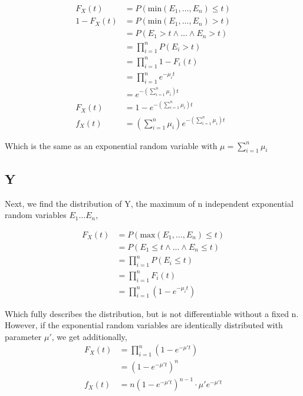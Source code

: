\documentclass{article}
\begin{document}
    \begin{align*}
            F_X(t) &= P(\text{min}(E_1, \dots, E_n) \le t) \\
        1 - F_X(t) &= P(\text{min}(E_1, \dots, E_n) > t) \\
                   &= P(E_1 > t \land \dots \land E_n > t) \\
                   &= \prod_{i=1}^n P(E_i > t) \\
                   &= \prod_{i=1}^n 1 - F_i(t) \\
                   &= \prod_{i=1}^n e^{-\mu_i t} \\
                   &= e^{-(\sum_{i=1}^n\mu_i) t} \\
            F_X(t) &= 1 - e^{-(\sum_{i=1}^n\mu_i) t} \\
            f_X(t) &= (\sum_{i=1}^n\mu_i) e^{-(\sum_{i=1}^n\mu_i) t}
    \end{align*}

    Which is the same as an exponential random variable with $\mu =
    \sum_{i=1}^n\mu_i$

    \subsection*{Y}

    Next, we find the distribution of Y, the maximum of n independent
    exponential random variables $E_1 \dots E_n$,

    \begin{align*}
            F_X(t) &= P(\text{max}(E_1, \dots, E_n) \le t) \\
                   &= P(E_1 \le t \land \dots \land E_n \le t) \\
                   &= \prod_{i=1}^n P(E_i \le t) \\
                   &= \prod_{i=1}^n F_i(t) \\
                   &= \prod_{i=1}^n (1 - e^{-\mu_i t})
    \end{align*}

    Which fully describes the distribution, but is not differentiable without a
    fixed n.  However, if the exponential random variables are identically
    distributed with parameter $\mu'$, we get additionally,
    \begin{align*}
            F_X(t) &= \prod_{i=1}^n (1 - e^{-\mu' t}) \\
                   &= (1 - e^{-\mu' t})^n \\
            f_X(t) &= n (1 - e^{-\mu' t})^{n-1} \cdot \mu' e^{-\mu' t}
    \end{align*}
\end{document}
